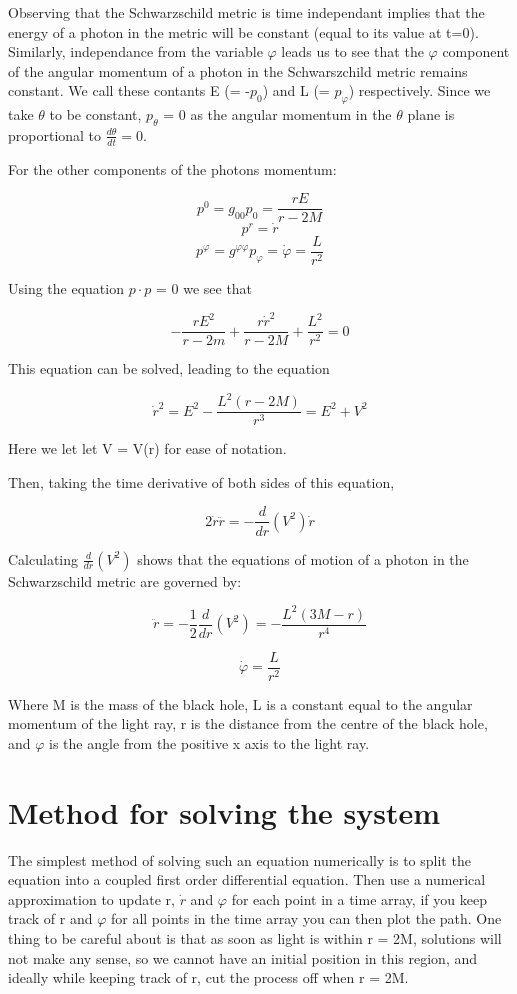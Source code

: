 \documentclass[oneside,openright,frontopenright]{dmathesis}
\begin{document}
	Observing that the Schwarzschild metric is time independant implies that the energy of a photon in the metric will be constant (equal to its value at t=0). Similarly, independance from the variable $\varphi$ leads us to see that the $\varphi$ component of the angular momentum of a photon in the Schwarszchild metric remains constant. We call these contants E (= -$p_0$) and L (= $p_\varphi$) respectively. Since we take ${\theta}$ to be constant, $p_\theta$ = 0 as the angular momentum in the $\theta$ plane is proportional to $\frac{d\theta}{dt} = 0$.

	For the other components of the photons momentum:

	\[p^0 = g_{00}p_0 = \frac{rE}{r-2M} \]
	\[p^r = \dot{r}\]
	\[p^\varphi = g^{\varphi\varphi}p_\varphi = \dot{\varphi} = \frac{L}{r^2}\]

	Using the equation $p \cdot p$ = 0 we see that

	\[-\frac{rE^2}{r-2m}+\frac{r\dot{r}^2}{r-2M}+\frac{L^2}{r^2}=0\]

	This equation can be solved, leading to the equation

	\[\dot{r}^2 = E^2-\frac{L^2(r-2M)}{r^3} = E^2 + V^2\]

	Here we let let V = V(r) for ease of notation.

	Then, taking the time derivative of both sides of this equation,

	\[2\dot{r}\ddot{r} = -\frac{d}{dr}(V^2)\dot{r}\]

	Calculating $\frac{d}{dr}(V^2)$ shows that the equations of motion of a photon in the Schwarzschild metric are governed by:

	\[\ddot{r} = -\frac{1}{2}\frac{d}{dr}(V^2) = -\frac{L^2(3M-r)}{r^4}\]

	\[\dot{\varphi}=\frac{L}{r^2}\]


	Where M is the mass of the black hole, L is a constant equal to the angular momentum of the light ray, r is the distance from the centre of the black hole, and $\varphi$ is the angle from the positive x axis to the light ray.

\section{Method for solving the system}
	The simplest method of solving such an equation numerically is to split the equation into a coupled first order differential equation. Then use a numerical approximation to update r, $\dot{r}$ and $\varphi$ for each point in a time array, if you keep track of r and $\varphi$ for all points in the time array you can then plot the path. One thing to be careful about is that as soon as light is within r = 2M, solutions will not make any sense, so we cannot have an initial position in this region, and ideally while keeping track of r, cut the process off when r = 2M.
\end{document}
